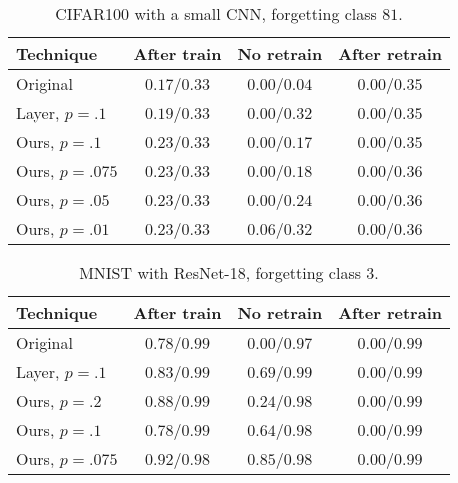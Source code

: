 \documentclass{article}
\begin{document}
\begin{table}
    \centering
    \caption{CIFAR100 with a small CNN, forgetting class $81$.}
    \label{tab:cifar_small_cnn}
    \begin{tabular}{l | c | c c}
        Technique&After train&No retrain&After retrain\\
        \hline
        Original&$0.17$/$0.33$&$0.00$/$0.04$&$0.00$/$0.35$\\
        Layer, $p=.1$&$0.19$/$0.33$&$0.00$/$0.32$&$0.00$/$0.35$\\
        \hline
        Ours, $p=.1$&$0.23$/$0.33$&$0.00$/$0.17$&$0.00$/$0.35$\\
        Ours, $p=.075$&$0.23$/$0.33$&$0.00$/$0.18$&$0.00$/$0.36$\\
        Ours, $p=.05$&$0.23$/$0.33$&$0.00$/$0.24$&$0.00$/$0.36$\\
        Ours, $p=.01$&$0.23$/$0.33$&$0.06$/$0.32$&$0.00$/$0.36$\\
    \end{tabular}
\end{table}

\begin{table}
    \centering
    \caption{MNIST with ResNet-18, forgetting class $3$.}
    \label{tab:mnist_resnet}
    \begin{tabular}{l | c | c c}
        Technique&After train&No retrain&After retrain\\
        \hline
        Original&$0.78$/$0.99$&$0.00$/$0.97$&$0.00$/$0.99$\\
        Layer, $p=.1$&$0.83$/$0.99$&$0.69$/$0.99$&$0.00$/$0.99$\\
        \hline
        Ours, $p=.2$&$0.88$/$0.99$&$0.24$/$0.98$&$0.00$/$0.99$\\
        Ours, $p=.1$&$0.78$/$0.99$&$0.64$/$0.98$&$0.00$/$0.99$\\
        Ours, $p=.075$&$0.92$/$0.98$&$0.85$/$0.98$&$0.00$/$0.99$\\
    \end{tabular}
\end{table}
\end{document}
